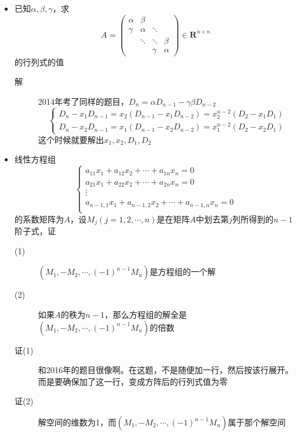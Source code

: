 \begin{itemize}
\item 已知$\alpha,\beta,\gamma$，求
\[
A= \left(
\begin{array}{cccc}
 \alpha & \beta & & \\
\gamma & \alpha & \ddots & \\
 & \ddots & \ddots & \beta \\
 & & \gamma & \alpha
\end{array}
\right) \in \mathbf{R}^{n \times n}
\]
的行列式的值
\begin{description}
\item[解] 2014年考了同样的题目，$D_n=\alpha D_{n-1}-\gamma\beta D_{n-2}$
\[
\begin{cases}
D_n-x_1D_{n-1}=x_2(D_{n-1}-x_1D_{n-2})=x_2^{n-2}(D_2-x_1D_1)\\
D_n-x_2D_{n-1}=x_1(D_{n-1}-x_2D_{n-2})=x_1^{n-2}(D_2-x_2D_1)
\end{cases}
\]
这个时候就要解出$x_1,x_2,D_1,D_2$
\end{description}

\item 线性方程组
\[
\begin{cases}
a_{11}x_1 + a_{12}x_2 + \cdots + a_{1n}x_n =0\\
a_{21}x_1 + a_{22}x_2 + \cdots + a_{2n}x_n =0\\
\vdots \\
a_{n-1,1}x_1 + a_{n-1,2}x_2 + \cdots + a_{n-1,n}x_n =0\\
\end{cases}
\]
的系数矩阵为$A$，设$M_j(j=1,2,\cdots,n)$是在矩阵$A$中划去第$j$列所得到的$n-1$阶子式，证
\begin{description}
\item[(1)] $(M_1,-M_2,\cdots,(-1)^{n-1}M_n)$是方程组的一个解
\item[(2)] 如果$A$的秩为$n-1$，那么方程组的解全是$(M_1,-M_2,\cdots,(-1)^{n-1}M_n)$的倍数
\item[证(1)] 和2016年的题目很像啊。在这题，不是随便加一行，然后按该行展开。而是要确保加了这一行，变成方阵后的行列式值为零
\item[证(2)] 解空间的维数为1，而$(M_1,-M_2,\cdots,(-1)^{n-1}M_n)$属于那个解空间
\end{description}


\end{itemize}
